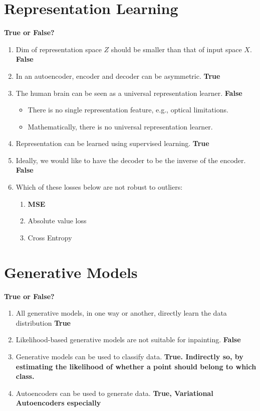 \documentclass{report}
\numberwithin{equation}{section}
\begin{document}
\section{Representation Learning}
\textbf{True or False?}
\begin{enumerate}
    \item Dim of representation space $Z$ should be smaller than that of input space $X$. \textbf{False}
    \item In an autoencoder, encoder and decoder can be asymmetric. \textbf{True}
    \item The human brain can be seen as a universal representation learner. \textbf{False}
    \begin{itemize}
        \item There is no single representation feature, e.g., optical limitations.
        \item Mathematically, there is no universal representation learner.
    \end{itemize}
    \item Representation can be learned using supervised learning. \textbf{True}
    \item Ideally, we would like to have the decoder to be the inverse of the encoder. \textbf{False}
    \item Which of these losses below are not robust to outliers:
    \begin{enumerate}[label=\alph*.]
        \item \textbf{MSE}
        \item Absolute value loss
        \item Cross Entropy
    \end{enumerate}
\end{enumerate}

\section{Generative Models}
\textbf{True or False?}
\begin{enumerate}
    \item All generative models, in one way or another, directly learn the data distribution \textbf{True}
    \item Likelihood-based generative models are not suitable for inpainting. \textbf{False}
    \item Generative models can be used to classify data. \textbf{True. Indirectly so, by estimating the likelihood of whether a point should belong to which class.}
    \item Autoencoders can be used to generate data. \textbf{True, Variational Autoencoders especially}
\end{enumerate}
\end{document}
